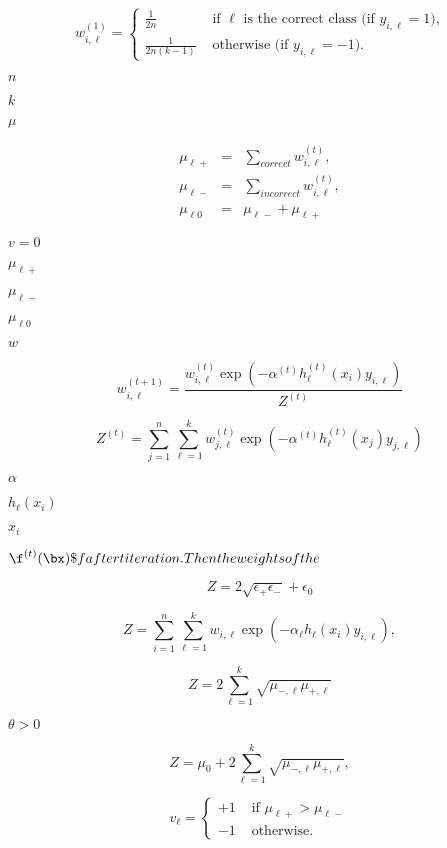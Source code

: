\documentclass{article}
\begin{document}
\[ w_{i,\ell}^{(1)} = \begin{cases} \frac{1}{2n} & \mbox{ if $\ell$ is the correct class (if $y_{i,\ell} = 1$),} \\ \frac{1}{2n(k-1)} & \mbox{ otherwise (if $y_{i,\ell} = -1$).} \end{cases} \]
\pagebreak

$n$
\pagebreak

$k$
\pagebreak

$\mu$
\pagebreak

\begin{eqnarray*} \mu_{\ell+} & = & \sum_{correct} w_{i,\ell}^{(t)},\\ \mu_{\ell-} &=& \sum_{incorrect} w_{i,\ell}^{(t)}, \\ \mu_{\ell0} & = & \mu_{\ell-} + \mu_{\ell+} \end{eqnarray*}
\pagebreak

$v=0$
\pagebreak

$\mu_{\ell+}$
\pagebreak

$\mu_{\ell-}$
\pagebreak

$\mu_{\ell0}$
\pagebreak

$w$
\pagebreak

\[ w^{(t+1)}_{i, \ell}= \frac{ w^{(t)}_{i, \ell} \exp \left( -\alpha^{(t)} h_\ell^{(t)}(x_i) y_{i, \ell} \right) }{ Z^{(t)} } \]
\pagebreak

\[ Z^{(t)} = \sum_{j=1}^n \sum_{\ell=1}^k w^{(t)}_{j, \ell} \exp \left( -\alpha^{(t)} h_\ell^{(t)}(x_j) y_{j, \ell} \right) \]
\pagebreak

$\alpha$
\pagebreak

$h_\ell(x_i)$
\pagebreak

$x_i$
\pagebreak

$\f^{(t)}(\bx)\$f after t iteration. Then the weights of the $
\pagebreak

\[ Z = 2 \sqrt{\epsilon_+ \epsilon_-} + \epsilon_0 \]
\pagebreak

\[ Z = \sum_{i=1}^n \sum_{\ell=1}^k w_{i,\ell} \exp{ \left( -\alpha_\ell h_\ell(x_i) y_{i,\ell} \right) }, \]
\pagebreak

\[ Z = 2 \sum_{\ell=1}^k \sqrt{ \mu_{-,\ell} \mu_{+,\ell} } \]
\pagebreak

$\theta > 0$
\pagebreak

\[ Z = \mu_0 + 2 \sum_{\ell=1}^k \sqrt{ \mu_{-,\ell} \mu_{+,\ell} }, \]
\pagebreak

\[ v_\ell = \begin{cases} +1 & \mbox{ if } \mu_{\ell+} > \mu_{\ell-}\\ -1 & \mbox{ otherwise.} \end{cases} \]
\pagebreak
\end{document}
